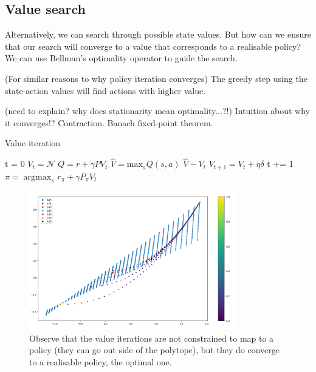 \newpage

\subsection{Value search}

Alternatively, we can search through possible state values. But how can we ensure that our search will
converge to a value that corresponds to a realisable policy? We can use Bellman's
optimality operator to guide the search.

(For similar reasons to why policy iteration converges) The greedy step using the
state-action values will find actions with higher value.

{\color{red}(need to explain? why does stationarity mean optimality...?!)}
Intuition about why it converges!? Contraction. Banach fixed-point theorem.

\begin{algorithm}
\caption{Value iteration}
\begin{algorithmic}[1]

  \State t = 0
  \State $V_t = \mathcal N$ 
    \State $Q = r + \gamma PV_t$ 
    \State $\hat V = \text{max}_a Q(s, a)$  
    \State $\hat V - V_t$ 
    \State $V_{t+1} = V_t + \eta \delta$ 
    \State t += 1
  \EndWhile
  \State $\pi = \mathop{\text{argmax}}_{\pi} r_{\pi} + \gamma P_{\pi}V_t$
  \State \algorithmicreturn{ $\pi$}
\EndProcedure

\end{algorithmic}
\end{algorithm}

\begin{figure}[h!]
\centering
\includegraphics[width=0.8\textwidth,height=0.4\textheight]{../../pictures/figures/vi-polytope.png}
\caption{Observe that the value iterations are not constrained to map to a policy
(they can go out side of the polytope), but they do converge to a realisable policy,
the optimal one.}
\end{figure}

